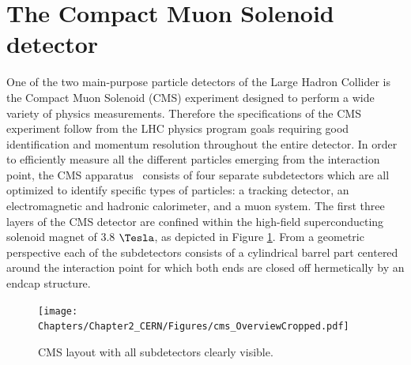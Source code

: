 \section{The Compact Muon Solenoid detector}\label{sec::CMS}

One of the two main-purpose particle detectors of the Large Hadron Collider is the Compact Muon Solenoid (CMS) experiment designed to perform a wide variety of physics measurements. Therefore the specifications of the CMS experiment follow from the LHC physics program goals requiring good identification and momentum resolution throughout the entire detector.
In order to efficiently measure all the different particles emerging from the interaction point, the CMS apparatus~\cite{CMSTDR} consists of four separate subdetectors which are all optimized to identify specific types of particles: a tracking detector, an electromagnetic and hadronic calorimeter, and a muon system. 
The first three layers of the CMS detector are confined within the high-field superconducting solenoid magnet of 3.8 $\Tesla$, as depicted in Figure \ref{fig::CMSFig}. 
From a geometric perspective each of the subdetectors consists of a cylindrical barrel part centered around the interaction point for which both ends are closed off hermetically by an endcap structure.
\begin{figure}[h!t]
 \centering
 \texttt{[image: Chapters/Chapter2\_CERN/Figures/cms\_OverviewCropped.pdf]}%
 \caption{CMS layout with all subdetectors clearly visible.} \label{fig::CMSFig}
\end{figure}

